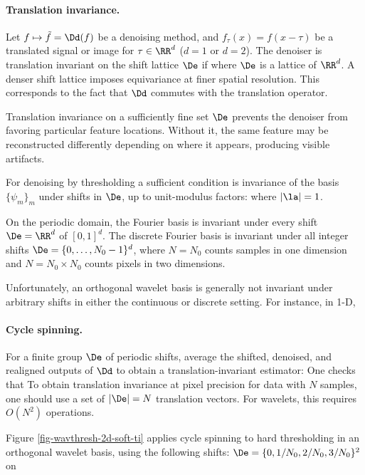   
\paragraph{Translation invariance.}

Let $f\mapsto\tilde f=\Dd(f)$ be a denoising method, and $f_\tau(x) = f(x-\tau)$ be a translated signal or image for $\tau \in \RR^d$ ($d=1$ or $d=2$).
The denoiser is translation invariant on the shift lattice $\De$ if
where $\De$ is a lattice of $\RR^d$. A denser shift lattice imposes equivariance at finer spatial resolution.
This corresponds to the fact that $\Dd$ commutes with the translation operator.
\begin{center}
\end{center}
Translation invariance on a sufficiently fine set $\De$ prevents the denoiser from favoring particular feature locations. Without it, the same feature may be reconstructed differently depending on where it appears, producing visible artifacts.

For denoising by thresholding 
a sufficient condition is invariance of the basis $\{\psi_m\}_m$ under shifts in $\De$, up to unit-modulus factors:
where $|\la|=1$.

On the periodic domain, the Fourier basis is invariant under every shift $\De=\RR^d$ of $[0,1]^d$. The discrete Fourier basis is invariant under all integer shifts $\De=\{0,\ldots,N_0-1\}^d$, where $N=N_0$ counts samples in one dimension and $N=N_0 \times N_0$ counts pixels in two dimensions.

Unfortunately, an orthogonal wavelet basis 
is generally not invariant under arbitrary shifts in either the continuous or discrete setting. For instance, in 1-D,

  
\paragraph{Cycle spinning.}

For a finite group $\De$ of periodic shifts, average the shifted, denoised, and realigned outputs of $\Dd$ to obtain a translation-invariant estimator:
One checks that
To obtain translation invariance at pixel precision for data with $N$ samples, one should use a set of $|\De|=N$ translation vectors. For wavelets, this requires $O(N^2)$ operations.

Figure \ref{fig-wavthresh-2d-soft-ti} applies cycle spinning to hard thresholding in an orthogonal wavelet basis, using the following shifts:
$\De = \{ 0, 1/N_0, 2/N_0, 3/N_0 \}^2$ on 